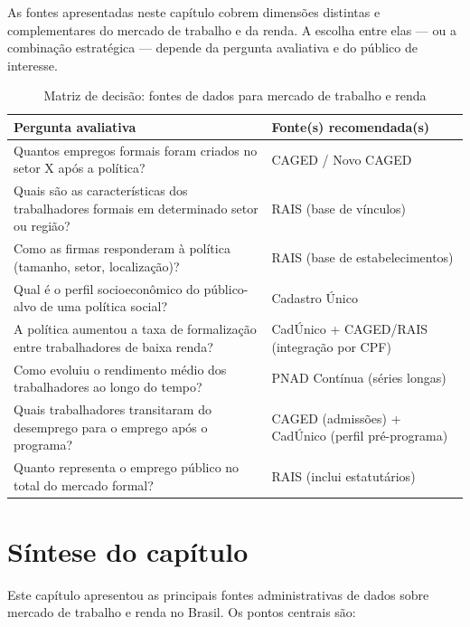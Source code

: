 As fontes apresentadas neste capítulo cobrem dimensões distintas e complementares do mercado de trabalho e da renda. A escolha entre elas — ou a combinação estratégica — depende da pergunta avaliativa e do público de interesse.

\begin{table}[H]
\centering
\caption{Matriz de decisão: fontes de dados para mercado de trabalho e renda}
\label{tab:matriz_trabalho}
\small
\begin{tabularx}{\textwidth}{@{} p{4.5cm} X @{}}
\toprule
\textbf{Pergunta avaliativa} & \textbf{Fonte(s) recomendada(s)} \\
\midrule
Quantos empregos formais foram criados no setor X após a política? & CAGED / Novo CAGED \\
\addlinespace
Quais são as características dos trabalhadores formais em determinado setor ou região? & RAIS (base de vínculos) \\
\addlinespace
Como as firmas responderam à política (tamanho, setor, localização)? & RAIS (base de estabelecimentos) \\
\addlinespace
Qual é o perfil socioeconômico do público-alvo de uma política social? & Cadastro Único \\
\addlinespace
A política aumentou a taxa de formalização entre trabalhadores de baixa renda? & CadÚnico + CAGED/RAIS (integração por CPF) \\
\addlinespace
Como evoluiu o rendimento médio dos trabalhadores ao longo do tempo? & PNAD Contínua (séries longas) \\
\addlinespace
Quais trabalhadores transitaram do desemprego para o emprego após o programa? & CAGED (admissões) + CadÚnico (perfil pré-programa) \\
\addlinespace
Quanto representa o emprego público no total do mercado formal? & RAIS (inclui estatutários) \\
\bottomrule
\end{tabularx}
\end{table}

\section{Síntese do capítulo}

Este capítulo apresentou as principais fontes administrativas de dados sobre mercado de trabalho e renda no Brasil. Os pontos centrais são:

